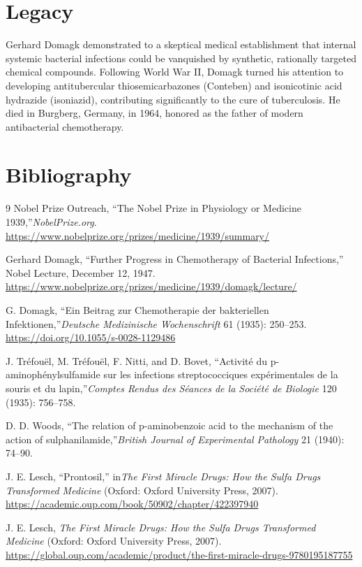 \section{Legacy}

Gerhard Domagk demonstrated to a skeptical medical establishment that internal systemic bacterial infections could be vanquished by synthetic, rationally targeted chemical compounds. Following World War II, Domagk turned his attention to developing antitubercular thiosemicarbazones (Conteben) and isonicotinic acid hydrazide (isoniazid), contributing significantly to the cure of tuberculosis. He died in Burgberg, Germany, in 1964, honored as the father of modern antibacterial chemotherapy.

\section{Bibliography}

\begin{thebibliography}{9}
Nobel Prize Outreach, ``The Nobel Prize in Physiology or Medicine 1939,''\emph{NobelPrize.org}.\\
\url{https://www.nobelprize.org/prizes/medicine/1939/summary/}

Gerhard Domagk, ``Further Progress in Chemotherapy of Bacterial Infections,'' Nobel Lecture, December 12, 1947.\\
\url{https://www.nobelprize.org/prizes/medicine/1939/domagk/lecture/}

G. Domagk, ``Ein Beitrag zur Chemotherapie der bakteriellen Infektionen,''\emph{Deutsche Medizinische Wochenschrift} 61 (1935): 250--253.\\
\url{https://doi.org/10.1055/s-0028-1129486}

J. Tréfouël, M. Tréfouël, F. Nitti, and D. Bovet, ``Activité du p-aminophénylsulfamide sur les infections streptococciques expérimentales de la souris et du lapin,''\emph{Comptes Rendus des Séances de la Société de Biologie} 120 (1935): 756--758.

D. D. Woods, ``The relation of p-aminobenzoic acid to the mechanism of the action of sulphanilamide,''\emph{British Journal of Experimental Pathology} 21 (1940): 74--90.

J. E. Lesch, ``Prontosil,'' in\emph{The First Miracle Drugs: How the Sulfa Drugs Transformed Medicine} (Oxford: Oxford University Press, 2007).\\
\url{https://academic.oup.com/book/50902/chapter/422397940}

J. E. Lesch, \emph{The First Miracle Drugs: How the Sulfa Drugs Transformed Medicine} (Oxford: Oxford University Press, 2007).\\
\url{https://global.oup.com/academic/product/the-first-miracle-drugs-9780195187755}
\end{thebibliography}
